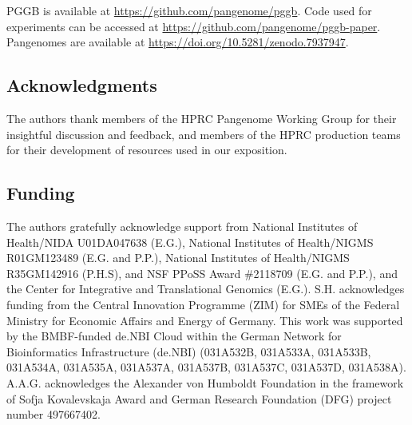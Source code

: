 \documentclass[pdflatex,mathphys]{jnl}%
\theoremstyle{thmstyleone}%
\theoremstyle{thmstyletwo}%
\theoremstyle{thmstylethree}%
\begin{document}



\backmatter

 PGGB is available at \url{https://github.com/pangenome/pggb}. Code used for experiments can be accessed at \url{https://github.com/pangenome/pggb-paper}. Pangenomes are available at \url{https://doi.org/10.5281/zenodo.7937947}.

\subsection*{Acknowledgments}

The authors thank members of the HPRC Pangenome Working Group for their insightful discussion and feedback, and members of the HPRC production teams for their development of resources used in our exposition.

\subsection*{Funding}

The authors gratefully acknowledge support from National Institutes of Health/NIDA U01DA047638 (E.G.), National Institutes of Health/NIGMS R01GM123489 (E.G. and P.P.), National Institutes of Health/NIGMS R35GM142916 (P.H.S), and NSF PPoSS Award \#2118709 (E.G. and P.P.), and the Center for Integrative and Translational Genomics (E.G.). S.H. acknowledges funding from the Central Innovation Programme (ZIM) for SMEs of the Federal Ministry for Economic Affairs and Energy of Germany. This work was supported by the BMBF-funded de.NBI Cloud within the German Network for Bioinformatics Infrastructure (de.NBI) (031A532B, 031A533A, 031A533B, 031A534A, 031A535A, 031A537A, 031A537B, 031A537C, 031A537D, 031A538A). A.A.G. acknowledges the Alexander von Humboldt Foundation in the framework of Sofja Kovalevskaja Award and German Research Foundation (DFG) project number 497667402.
\end{document}

